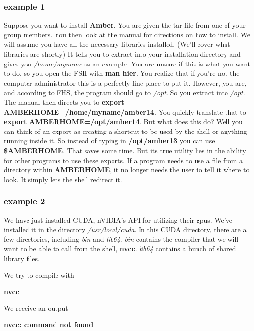 \documentclass{article}
\begin{document}
\subsubsection*{example 1}
Suppose you want to install \textbf{Amber}. 
You are given the tar file from one of your group members.
You then look at the manual for directions on how to install.
We will assume you have all the necessary libraries installed. (We'll cover what libraries are shortly)
It tells you to extract into your installation directory and gives you \textit{/home/myname} as an example.
You are unsure if this is what you want to do, so you open the FSH with \textbf{man hier}.
You realize that if you're not the computer administrator this is a perfectly fine place to put it.
However, you are, and according to FHS, the program should go to \textit{/opt}.
So you extract into \textit{/opt}.
The manual then directs you to \textbf{export AMBERHOME=/home/myname/amber14}.
You quickly translate that to \textbf{export AMBERHOME=/opt/amber14}.
But what does this do?
Well you can think of an export as creating a shortcut to be used by the shell or anything running inside it.
So instead of typing in \textbf{/opt/amber13} you can use \textbf{\$AMBERHOME}.
That saves some time. 
But its true utility lies in the ability for other programs to use these exports.
If a program needs to use a file from a directory within \textbf{AMBERHOME}, it no longer needs the user to tell it where to look.
It simply lets the shell redirect it.

\subsubsection*{example 2}
We have just installed CUDA, nVIDIA's API for utilizing their gpus.
We've installed it in the directory \textit{/usr/local/cuda}.
In this CUDA directory, there are a few directories, including  \textit{bin} and \emph{lib64}.
\textit{bin} contains the compiler that we will want to be able to call from the shell, \textbf{nvcc}.
\textit{lib64} contains a bunch of shared library files.

We try to compile with \smallskip \\

\centerline{\textbf{nvcc}} \smallskip

\hfill

We receive an output \smallskip \\

\centerline{\textbf{nvcc: command not found}} \smallskip 
\end{document}
